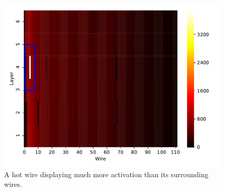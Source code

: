 \begin{figure}
  \centering
  \includegraphics[width=\textwidth]{../figures/hot_wire}
  \caption{A hot wire displaying much more activation than its
    surrounding wires.}
  \label{fig:hot-wire}
\end{figure}


